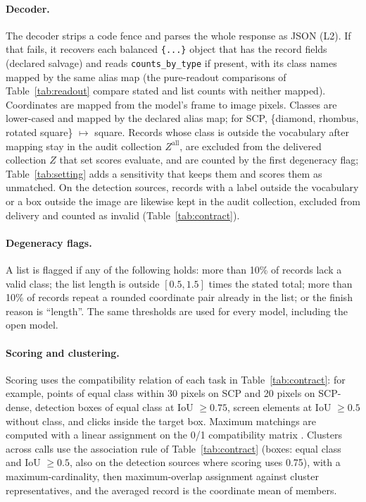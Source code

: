 \paragraph{Decoder.} The decoder strips a code fence and parses the whole response as JSON (L2). If that fails, it recovers each balanced \texttt{\{...\}} object that has the record fields (declared salvage) and reads \texttt{counts\_by\_type} if present, with its class names mapped by the same alias map (the pure-readout comparisons of Table~\ref{tab:readout} compare stated and list counts with neither mapped). Coordinates are mapped from the model's frame to image pixels. Classes are lower-cased and mapped by the declared alias map; for SCP, \{diamond, rhombus, rotated square\} $\mapsto$ square. Records whose class is outside the vocabulary after mapping stay in the audit collection $Z^{\mathrm{all}}$, are excluded from the delivered collection $Z$ that set scores evaluate, and are counted by the first degeneracy flag; Table~\ref{tab:setting} adds a sensitivity that keeps them and scores them as unmatched. On the detection sources, records with a label outside the vocabulary or a box outside the image are likewise kept in the audit collection, excluded from delivery and counted as invalid (Table~\ref{tab:contract}).

\paragraph{Degeneracy flags.} A list is flagged if any of the following holds: more than 10\% of records lack a valid class; the list length is outside $[0.5,1.5]$ times the stated total; more than 10\% of records repeat a rounded coordinate pair already in the list; or the finish reason is ``length''. The same thresholds are used for every model, including the open model.

\paragraph{Scoring and clustering.} Scoring uses the compatibility relation of each task in Table~\ref{tab:contract}: for example, points of equal class within 30 pixels on SCP and 20 pixels on SCP-dense, detection boxes of equal class at IoU $\ge 0.75$, screen elements at IoU $\ge 0.5$ without class, and clicks inside the target box. Maximum matchings are computed with a linear assignment on the 0/1 compatibility matrix \citep{kuhn1955hungarian}. Clusters across calls use the association rule of Table~\ref{tab:contract} (boxes: equal class and IoU $\ge0.5$, also on the detection sources where scoring uses 0.75), with a maximum-cardinality, then maximum-overlap assignment against cluster representatives, and the averaged record is the coordinate mean of members.

